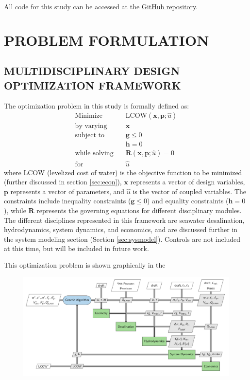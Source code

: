 \documentclass[twocolumn,10pt]{asme2e}
\begin{document}
All code for this study can be accessed at the \href{https://github.com/symbiotic-engineering/mdo\_wd2}{GitHub repository}.

\section{PROBLEM FORMULATION}
\subsection{MULTIDISCIPLINARY DESIGN OPTIMIZATION FRAMEWORK}
The optimization problem in this study is formally defined as:
\begin{align*} 
    \text{Minimize} \quad & \text{LCOW}(\mathbf{x},\mathbf{p}; \hat{u})  \\
    \text{by varying} \quad & \mathbf{x}\\
    \text{subject to } \quad &  \mathbf{g} \leq 0 \\
                             &  \mathbf{h} = 0 \\
    \text{while solving} \quad & \mathbf{R}(\mathbf{x},\mathbf{p};\hat{u}) = 0\\
    \text{for } \quad & \hat{u}
    \label{eq:problem}
\end{align*}
\noindent where LCOW (levelized cost of water) is the objective function to be minimized (further discussed in section \ref{sec:econ}), $\mathbf{x}$ represents a vector of design variables, $\mathbf{p}$ represents a vector of parameters, and $\hat{u}$ is the vector of coupled variables. The constraints include inequality constraints ($\mathbf{g} \leq 0$) and equality constraints ($\mathbf{h}=0$), while $\mathbf{R}$ represents the governing equations for different disciplinary modules. The different disciplines represented in this framework are seawater desalination, hydrodynamics, system dynamics, and economics, and are discussed further in the system modeling section (Section \ref{sec:sysmodel}). Controls are not included at this time, but will be included in future work.

This optimization problem is shown graphically in the 

\begin{figure}[t]
    \centering
    \includegraphics[width=\linewidth]{../figs/xDSM.pdf}
    \label{fig:xdsm}
\end{figure} 
 
\end{document}
